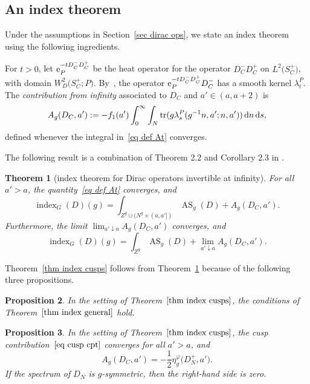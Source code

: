 \documentclass[pdftex]{sigma}%
\numberwithin{equation}{section}
\newtheorem{Theorem}{Theorem}[section]
\newtheorem{Proposition}[Theorem]{Proposition}
 { \theoremstyle{definition}
\newtheorem{Definition}[Theorem]{Definition}
\newtheorem{Note}[Theorem]{Note}
\newtheorem{Example}[Theorem]{Example}
\newtheorem{Remark}[Theorem]{Remark} }
\DeclareMathOperator{\tr}{tr}
\DeclareMathOperator{\AS}{AS}
\DeclareMathOperator{\ind}{index}
\begin{document}
\subsection{An index theorem} \label{sec index thm general}

Under the assumptions in Section~\ref{sec dirac ops}, we state an index theorem using the following ingredients.

For $t>0$, let ${\rm e}_{P}^{-t D_C^- D_C^+}$ be the heat operator for the operator
 $D^-_C D_C^+$ on $L^2\big(S_C^+\big)$, with domain $W^2_D\big(S_C^+; P\big)$.
By~\cite[Lemma 4.7]{HW21a}, the operator ${\rm e}_{P}^{-t D_C^- D_C^+}D_C^-$ has a smooth kernel $ \lambda_t^{P}$.
 The \emph{contribution from infinity} associated to $D_C$ and $a' \in (a,a+2)$ is
\begin{equation} \label{eq def At}
A_{g}(D_C, a') := -f_1(a') \int_0^{\infty}
\int_N \tr(g \lambda_s^{P}(g^{-1}n, a'; n, a'))\, {\rm d}n\,{\rm d}s,
\end{equation}
defined whenever
 the integral in~\eqref{eq def At} converges.

The following result is a combination of Theorem 2.2 and Corollary 2.3 in \cite{HW21a}.
\begin{Theorem}[index theorem for Dirac operators invertible at infinity]\label{thm index general}
 For all $a' > a$, the quantity~\eqref{eq def At} converges, and
\begin{equation} \label{eq index general}
\ind_G(D)(g) = \int_{Z^g \cup (N^g \times (a,a'])} \AS_g(D)+ A_{g}(D_C, a').
\end{equation}
Furthermore, the limit $\lim_{a' \downarrow a}A_{g}(D_C, a')$ converges, and
\[
\ind_G(D)(g) = \int_{Z^g} \AS_g(D)+ \lim_{a' \downarrow a}A_{g}(D_C, a').
\]
\end{Theorem}

Theorem~\ref{thm index cusps} follows from Theorem~\ref{thm index general} because of the following three propositions.
\begin{Proposition} \label{prop ind cusps cond}
In the setting of Theorem~$\ref{thm index cusps}$, the conditions of Theorem~$\ref{thm index general}$ hold.
\end{Proposition}

\begin{Proposition} \label{prop ind cusp contr}
In the setting of Theorem~$\ref{thm index cusps}$, the cusp contribution~$\eqref{eq cusp cpt}$ converges for all $a'>a$, and
\begin{equation*} %
A_{g}(D_C, a') = -\frac{1}{2}\eta_g^{\varphi}\big(D_N^+, a'\big).
\end{equation*}
If the spectrum of $D_N$ is $g$-symmetric, then the right-hand side is zero.
\end{Proposition}
\end{document}
